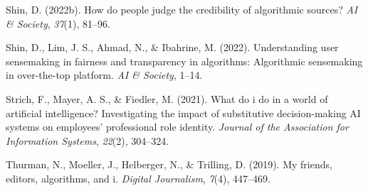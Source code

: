 \documentclass[
]{article}
\newlength{\cslhangindent}
\newenvironment{CSLReferences}[2] %
 {\begin{list}{}{%
  \setlength{\itemindent}{0pt}
  \setlength{\leftmargin}{0pt}
  \setlength{\parsep}{0pt}
  \ifodd #1
   \setlength{\leftmargin}{\cslhangindent}
   \setlength{\itemindent}{-1\cslhangindent}
  \fi
  \setlength{\itemsep}{#2\baselineskip}}}
 {\end{list}}
\begin{document}
\begin{CSLReferences}{1}{0}
Shin, D. (2022b). How do people judge the credibility of algorithmic
sources? \emph{AI \& Society}, \emph{37}(1), 81--96.

Shin, D., Lim, J. S., Ahmad, N., \& Ibahrine, M. (2022). Understanding
user sensemaking in fairness and transparency in algorithms: Algorithmic
sensemaking in over-the-top platform. \emph{AI \& Society}, 1--14.

Strich, F., Mayer, A. S., \& Fiedler, M. (2021). What do i do in a world
of artificial intelligence? Investigating the impact of substitutive
decision-making AI systems on employees' professional role identity.
\emph{Journal of the Association for Information Systems}, \emph{22}(2),
304--324.

Thurman, N., Moeller, J., Helberger, N., \& Trilling, D. (2019). My
friends, editors, algorithms, and i. \emph{Digital Journalism},
\emph{7}(4), 447--469.

\end{CSLReferences}
\end{document}

